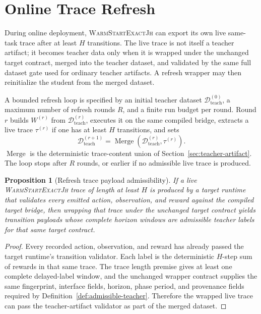 \documentclass[11pt]{article}
\newtheorem{proposition}{Proposition}
\newcommand{\Warm}{\textnormal{\textsc{WarmStartExactJh}}}
\newcommand{\Teach}{\mathcal{D}_{\mathrm{teach}}}
\begin{document}
\section{Online Trace Refresh}
\label{sec:refresh}

During online deployment, \Warm{} can export its own live same-task trace after
at least \(H\) transitions. The live trace is not itself a teacher artifact; it
becomes teacher data only when it is wrapped under the unchanged target
contract, merged into the teacher dataset, and validated by the same full
dataset gate used for ordinary teacher artifacts. A refresh wrapper may then
reinitialize the student from the merged dataset.

A bounded refresh loop is specified by an initial teacher dataset
\(\Teach^{(0)}\), a maximum number of refresh rounds \(R\), and a finite run
budget per round. Round \(r\) builds \(W^{(r)}\) from \(\Teach^{(r)}\), executes
it on the same compiled bridge, extracts a live trace \(\tau^{(r)}\) if one has
at least \(H\) transitions, and sets
\[
\Teach^{(r+1)}
=
\operatorname{Merge}(\Teach^{(r)},\tau^{(r)}).
\]
\(\operatorname{Merge}\) is the deterministic trace-content union of
Section~\ref{sec:teacher-artifact}. The loop stops after \(R\) rounds, or
earlier if no admissible live trace is produced.

\begin{proposition}[Refresh trace payload admissibility]
If a live \Warm{} trace of length at least \(H\) is produced by a target
runtime that validates every emitted action, observation, and reward against
the compiled target bridge, then wrapping that trace under the unchanged target
contract yields transition payloads whose complete horizon windows are
admissible teacher labels for that same target contract.
\end{proposition}

\begin{proof}
Every recorded action, observation, and reward has already passed the target
runtime's transition validator. Each label is the deterministic \(H\)-step sum
of rewards in that same trace. The trace length premise gives at least one
complete delayed-label window, and the unchanged wrapper contract supplies the
same fingerprint, interface fields, horizon, phase period, and provenance
fields required by Definition~\ref{def:admissible-teacher}. Therefore the
wrapped live trace can pass the teacher-artifact validator as part of the
merged dataset.
\end{proof}
\end{document}
